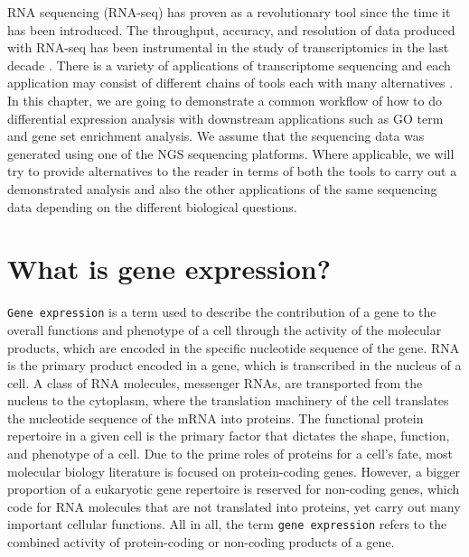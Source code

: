 \documentclass[12pt,]{krantz}
\begin{document}
RNA sequencing (RNA-seq) has proven as a revolutionary tool since the time it has been introduced. The throughput, accuracy, and resolution of data produced with RNA-seq has been instrumental in the study of transcriptomics in the last decade \citep{wang_rna-seq:_2009}. There is a variety of applications of transcriptome sequencing and each application may consist of different chains of tools each with many alternatives \citep{conesa_survey_2016}. In this chapter, we are going to demonstrate a common workflow of how to do differential expression analysis with downstream applications such as GO term and gene set enrichment analysis. We assume that the sequencing data was generated using one of the NGS sequencing platforms. Where applicable, we will try to provide alternatives to the reader in terms of both the tools to carry out a demonstrated analysis and also the other applications of the same sequencing data depending on the different biological questions.

\hypertarget{what-is-gene-expression}{%
\section{What is gene expression?}\label{what-is-gene-expression}}

\texttt{Gene\ expression} is a term used to describe the contribution of a gene to the overall functions and phenotype of a cell through the activity of the molecular products, which are encoded in the specific nucleotide sequence of the gene. RNA is the primary product encoded in a gene, which is transcribed in the nucleus of a cell. A class of RNA molecules, messenger RNAs, are transported from the nucleus to the cytoplasm, where the translation machinery of the cell translates the nucleotide sequence of the mRNA into proteins. The functional protein repertoire in a given cell is the primary factor that dictates the shape, function, and phenotype of a cell. Due to the prime roles of proteins for a cell's fate, most molecular biology literature is focused on protein-coding genes. However, a bigger proportion of a eukaryotic gene repertoire is reserved for non-coding genes, which code for RNA molecules that are not translated into proteins, yet carry out many important cellular functions. All in all, the term \texttt{gene\ expression} refers to the combined activity of protein-coding or non-coding products of a gene.
\end{document}
